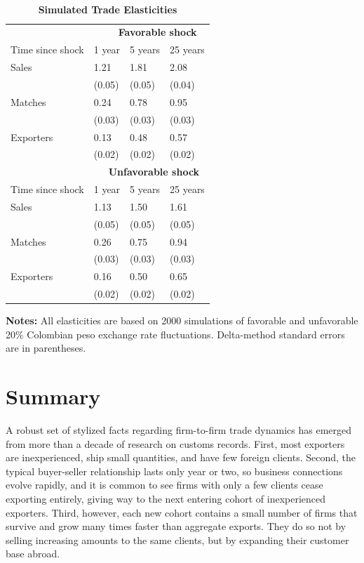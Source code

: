 \documentclass[12pt]{article}
\begin{document}
\begin{table}[tbp]
\caption{\textbf{Simulated Trade Elasticities}}
\label{tab:elasticities}\centering
{\small \ }
\par
{\small 
\begin{tabular}{llll}
\hline\hline
& \multicolumn{3}{l}{\ \ \ \ \ \textbf{Favorable shock}} \\ \cline{2-4}
Time since shock & 1 year & 5 years & 25 years \\ \hline
Sales & 1.21 & 1.81 & 2.08 \\ 
& (0.05) & (0.05) & (0.04) \\ 
Matches & 0.24 & 0.78 & 0.95 \\ 
& (0.03) & (0.03) & (0.03) \\ 
Exporters & 0.13 & 0.48 & 0.57 \\ 
& (0.02) & (0.02) & (0.02) \\ 
& \multicolumn{3}{l}{\ \ \ \textbf{Unfavorable shock}} \\ \cline{2-4}
Time since shock & 1 year & 5 years & 25 years \\ \hline
Sales & 1.13 & 1.50 & 1.61 \\ 
& (0.05) & (0.05) & (0.05) \\ 
Matches & 0.26 & 0.75 & 0.94 \\ 
& (0.03) & (0.03) & (0.03) \\ 
Exporters & 0.16 & 0.50 & 0.65 \\ 
& (0.02) & (0.02) & (0.02) \\ \hline
\end{tabular}
}
\par
{\endcenter
\begin{tablenotes}
\item \textbf{Notes:} All elasticities are based on 2000 simulations of favorable and unfavorable 20\% Colombian peso exchange rate fluctuations.  Delta-method standard errors are in parentheses.
\end{tablenotes}
}
\end{table}

\pagebreak

\section{Summary}

A robust set of stylized facts regarding firm-to-firm trade dynamics has
emerged from more than a decade of research on customs records. First, most
exporters are inexperienced, ship small quantities, and have few foreign
clients. Second, the typical buyer-seller relationship lasts only year or
two, so business connections evolve rapidly, and it is common to see firms
with only a few clients cease exporting entirely, giving way to the next
entering cohort of inexperienced exporters. Third, however, each new cohort
contains a small number of firms that survive and grow many times faster
than aggregate exports. They do so not by selling increasing amounts to the
same clients, but by expanding their customer base abroad.
\end{document}
